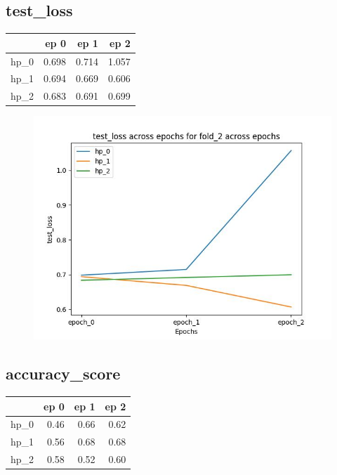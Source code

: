 \documentclass{article}
\begin{document}
\subsection{test\_loss}
\begin{tabular}{lrrr}
\toprule
{} &   ep 0 &   ep 1 &   ep 2 \\
\midrule
hp\_0 &  0.698 &  0.714 &  1.057 \\
hp\_1 &  0.694 &  0.669 &  0.606 \\
hp\_2 &  0.683 &  0.691 &  0.699 \\
\bottomrule
\end{tabular}

\begin{figure}[H]
\includegraphics[scale = 0.75]{fold_2/test_loss}
\end{figure}
\subsection{accuracy\_score}
\begin{tabular}{lrrr}
\toprule
{} &  ep 0 &  ep 1 &  ep 2 \\
\midrule
hp\_0 &  0.46 &  0.66 &  0.62 \\
hp\_1 &  0.56 &  0.68 &  0.68 \\
hp\_2 &  0.58 &  0.52 &  0.60 \\
\bottomrule
\end{tabular}
\end{document}
